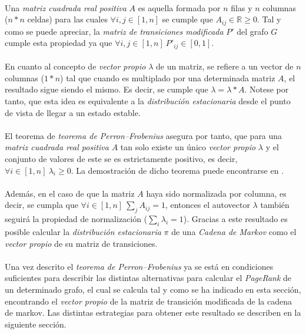 \documentclass{subfiles}
\begin{document}
        \paragraph{}
        Una \emph{matriz cuadrada real positiva} $A$ es aquella formada por $n$ filas y $n$ columnas ($n*n$ celdas) para las cuales $\forall i,j \in [1,n]$ se cumple que $A_{ij} \in \mathbb{R} \geq 0$. Tal y como se puede apreciar, la \emph{matriz de transiciones modificada} $P'$ del grafo $G$ cumple esta propiedad ya que $\forall i,j \in [1,n] \ P'_{ij} \in [0,1]$.

        \paragraph{}
        En cuanto al concepto de \emph{vector propio} $\lambda$ de un matriz, se refiere a un vector de $n$ columnas ($1*n$) tal que cuando es multiplado por una determinada matriz $A$, el resultado sigue siendo el mismo. Es decir, se cumple que $\lambda = \lambda * A$. Notese por tanto, que esta idea es equivalente a la \emph{distribución estacionaria} desde el punto de vista de llegar a un estado estable.

        \paragraph{}
        El teorema de \emph{teorema de Perron–Frobenius} asegura por tanto, que para una \emph{matriz cuadrada real positiva} $A$ tan solo existe un único \emph{vector propio} $\lambda$ y el conjunto de valores de este se es estrictamente positivo, es decir, $\forall i \in [1,n] \ \lambda_i \geq 0$. La demostración de dicho teorema puede encontrarse en \cite{boyle2005notes}.

        \paragraph{}
        Además, en el caso de que la matriz $A$ haya sido normalizada por columna, es decir, se cumpla que $\forall i \in [1,n] \ \sum_j A_{ij} = 1$, entonces el autovector $\lambda$ también seguirá la propiedad de normalización ($\sum_i \lambda_i = 1$). Gracias a este resultado es posible calcular la \emph{distribución estacionaria} $\pi$ de una \emph{Cadena de Markov} como el \emph{vector propio} de su matriz de transiciones.

      \paragraph{}
      Una vez descrito el \emph{teorema de Perron–Frobenius} ya se está en condiciones suficientes para describir las distintas alternativas para calcular el \emph{PageRank} de un determinado grafo, el cual se calcula tal y como se ha indicado en esta sección, encontrando el \emph{vector propio} de la matriz de transición modificada de la cadena de markov. Las distintas estrategias para obtener este resultado se describen en la siguiente sección.
\end{document}
